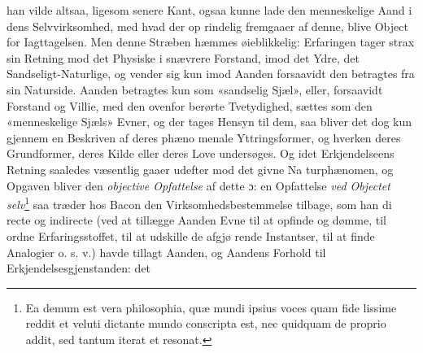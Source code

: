 \documentclass[12pt,a4paper]{book}
\begin{document}
han vilde altsaa, ligesom senere Kant, ogsaa kunne lade den
menneskelige Aand i dens Selvvirksomhed, med hvad der op\-%
rindelig fremgaaer af denne, blive Object for Iagttagelsen.
Men denne Stræben hæmmes øieblikkelig: Erfaringen tager
strax sin Retning mod det Physiske i snævrere Forstand, imod
det Ydre, det Sandseligt-Naturlige, og vender sig kun imod
Aanden forsaavidt den betragtes fra sin Naturside. Aanden
betragtes kun som «sandselig Sjæl», eller, forsaavidt Forstand
og Villie, med den ovenfor berørte Tvetydighed, sættes som
den «menneskelige Sjæls» Evner, og der tages Hensyn til dem,
saa bliver det dog kun gjennem en Beskriven af deres phæno\-%
menale Yttringsformer, og hverken deres Grundformer, deres
Kilde eller deres Love undersøges. Og idet Erkjendelseens
Retning saaledes væsentlig gaaer udefter mod det givne Na\-%
turphænomen, og Opgaven bliver den \emph{objective Opfattelse}
af dette ɔ: en Opfattelse \emph{ved Objectet selv}\footnote{Ea demum est vera philosophia, quæ mundi ipsius voces quam fide\-%
lissime reddit et veluti dictante mundo conscripta est, nec quidquam
de proprio addit, sed tantum iterat et resonat.} saa træder
hos Bacon den Virksomhedsbestemmelse tilbage, som han di\-%
recte og indirecte (ved at tillægge Aanden Evne til at opfinde
og dømme, til ordne Erfaringsstoffet, til at udskille de afgjø\-%
rende Instantser, til at finde Analogier o. s. v.) havde tillagt
Aanden, og Aandens Forhold til Erkjendelsesgjenstanden: det
\end{document}
